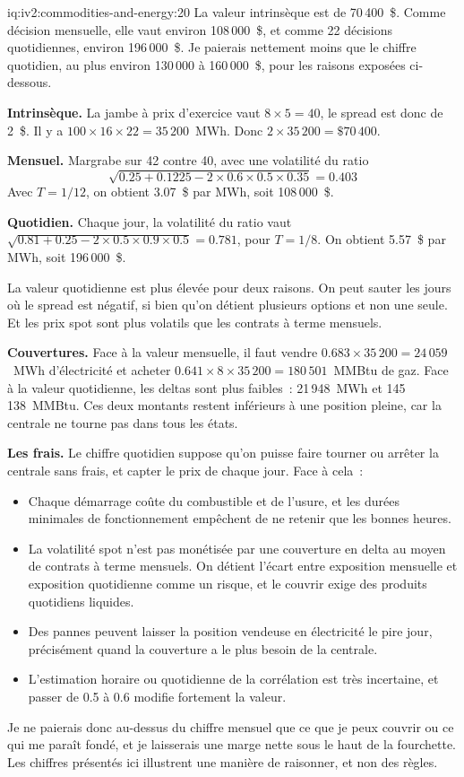 \begin{solution}{iq:iv2:commodities-and-energy:20}
La valeur intrinsèque est de 70\,400~\$. Comme décision mensuelle, elle vaut environ 108\,000~\$, et comme 22 décisions quotidiennes, environ 196\,000~\$. Je paierais nettement moins que le chiffre quotidien, au plus environ 130\,000 à 160\,000~\$, pour les raisons exposées ci-dessous.

\textbf{Intrinsèque.} La jambe à prix d'exercice vaut $8 \times 5 = 40$, le spread est donc de 2~\$. Il y a $100 \times 16 \times 22 = 35\,200$~MWh. Donc $2 \times 35\,200 = \$70\,400$.

\textbf{Mensuel.} Margrabe sur 42 contre 40, avec une volatilité du ratio
\[
\sqrt{0.25 + 0.1225 - 2 \times 0.6 \times 0.5 \times 0.35} = 0.403
\]
Avec $T = 1/12$, on obtient 3.07~\$ par MWh, soit 108\,000~\$.

\textbf{Quotidien.} Chaque jour, la volatilité du ratio vaut $\sqrt{0.81 + 0.25 - 2 \times 0.5 \times 0.9 \times 0.5} = 0.781$, pour $T = 1/8$. On obtient 5.57~\$ par MWh, soit 196\,000~\$.

La valeur quotidienne est plus élevée pour deux raisons. On peut sauter les jours où le spread est négatif, si bien qu'on détient plusieurs options et non une seule. Et les prix spot sont plus volatils que les contrats à terme mensuels.

\textbf{Couvertures.} Face à la valeur mensuelle, il faut vendre $0.683 \times 35\,200 = 24\,059$~MWh d'électricité et acheter $0.641 \times 8 \times 35\,200 = 180\,501$~MMBtu de gaz. Face à la valeur quotidienne, les deltas sont plus faibles~: 21\,948~MWh et 145\,138~MMBtu. Ces deux montants restent inférieurs à une position pleine, car la centrale ne tourne pas dans tous les états.

\textbf{Les frais.} Le chiffre quotidien suppose qu'on puisse faire tourner ou arrêter la centrale sans frais, et capter le prix de chaque jour. Face à cela~:
\begin{itemize}
\item Chaque démarrage coûte du combustible et de l'usure, et les durées minimales de fonctionnement empêchent de ne retenir que les bonnes heures.
\item La volatilité spot n'est pas monétisée par une couverture en delta au moyen de contrats à terme mensuels. On détient l'écart entre exposition mensuelle et exposition quotidienne comme un risque, et le couvrir exige des produits quotidiens liquides.
\item Des pannes peuvent laisser la position vendeuse en électricité le pire jour, précisément quand la couverture a le plus besoin de la centrale.
\item L'estimation horaire ou quotidienne de la corrélation est très incertaine, et passer de 0.5 à 0.6 modifie fortement la valeur.
\end{itemize}
Je ne paierais donc au-dessus du chiffre mensuel que ce que je peux couvrir ou ce qui me paraît fondé, et je laisserais une marge nette sous le haut de la fourchette. Les chiffres présentés ici illustrent une manière de raisonner, et non des règles.


\end{solution}

